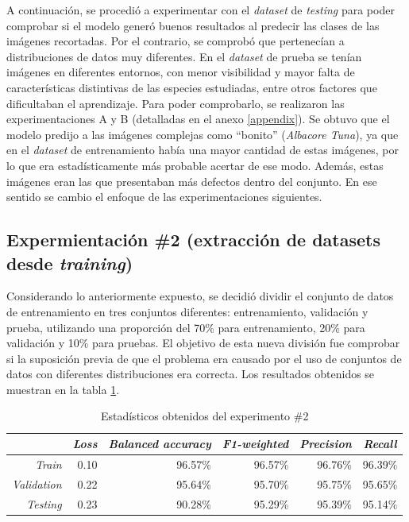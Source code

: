 A continuación, se procedió a experimentar con el \textit{dataset} de \textit{testing} para 
poder comprobar si el modelo generó buenos resultados al predecir las clases de las imágenes 
recortadas. Por el contrario, se comprobó que pertenecían a distribuciones de datos muy 
diferentes. En el \textit{dataset} de prueba se tenían imágenes en diferentes entornos, con 
menor visibilidad y mayor falta de características distintivas de las especies estudiadas, 
entre otros factores que dificultaban el aprendizaje. Para poder comprobarlo, se realizaron 
las experimentaciones A y B (detalladas en el anexo \ref{appendix}). Se obtuvo que el modelo 
predijo a las imágenes complejas como ``bonito'' (\textit{Albacore Tuna}), ya que en el 
\textit{dataset} de entrenamiento había una mayor cantidad de estas imágenes, por lo que era 
estadísticamente más probable acertar de ese modo. Además, estas imágenes eran las que 
presentaban más defectos dentro del conjunto. En ese sentido se cambio el enfoque de las 
experimentaciones siguientes.

\subsection{Expermientación \#2 (extracción de datasets desde \textit{training}) }
Considerando lo anteriormente expuesto, se decidió dividir el conjunto de datos de entrenamiento en tres conjuntos diferentes: entrenamiento, validación y prueba, utilizando una proporción del 70\% para entrenamiento, 20\% para validación y 10\% para pruebas. El objetivo de esta nueva división fue comprobar si la suposición previa de que el problema era causado por el uso de conjuntos de datos con diferentes distribuciones era correcta. Los resultados obtenidos se muestran en la tabla \ref{table:Results4}.
\\
\begin{table}[h!]
\footnotesize
\centering
\begin{tabular}{|r|r|r|r|r|r|}
\hline
           & \multicolumn{1}{c|}{\textit{Loss}} & \multicolumn{1}{c|}{\textit{Balanced accuracy}} & \multicolumn{1}{c|}{\textit{F1-weighted}} & \multicolumn{1}{c|}{\textit{Precision}} & \multicolumn{1}{c|}{\textit{Recall}} \\ \hline
\textit{Train}      & 0.10                      & 96.57\%                        & 96.57\%                 & 96.76\%                         & 96.39\%                     \\ \hline
\textit{Validation} & 0.22                      & 95.64\%                        & 95.70\%                 & 95.75\%                         & 95.65\%                     \\ \hline
\textit{Testing}    & 0.23                      & 90.28\%                       & 95.29\%                & 95.39\%                       & 95.14\%                    \\ \hline
\end{tabular}
\caption{Estadísticos obtenidos del experimento \#2}
\label{table:Results4}
\end{table}

